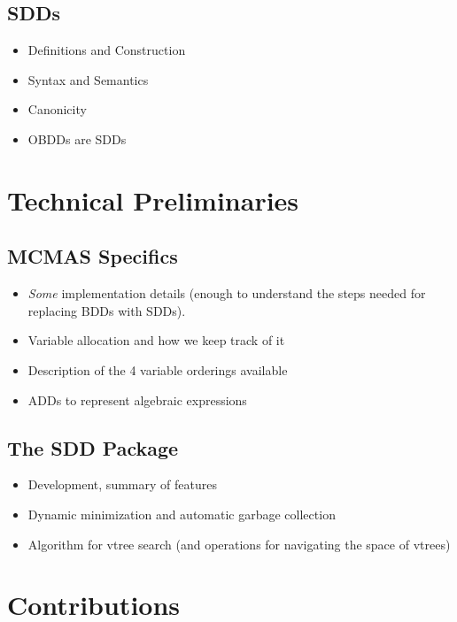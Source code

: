 \documentclass[12]{article}
\begin{document}
\subsection{SDDs}

\begin{itemize}
\item Definitions and Construction
\item Syntax and Semantics
\item Canonicity 
\item OBDDs are SDDs

\end{itemize}

\section{Technical Preliminaries}

\subsection{MCMAS Specifics} 

\begin{itemize}
\item \textit{Some }implementation details (enough to understand the steps needed for replacing BDDs with SDDs). 
\item Variable allocation and how we keep track of it
\item Description of the 4 variable orderings available
\item ADDs to represent algebraic expressions
\end{itemize}

\subsection{The SDD Package}

\begin{itemize}
\item Development, summary of features 
\item Dynamic minimization and automatic garbage collection
\item Algorithm for vtree search (and operations for navigating the space of vtrees)
\end{itemize}


\section{Contributions}
\end{document}
